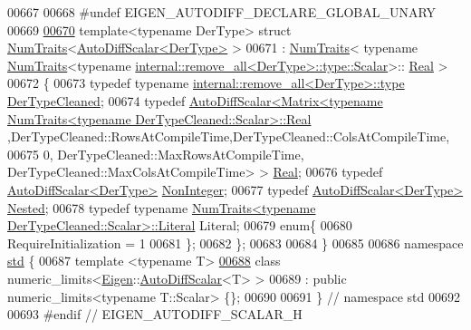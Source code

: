 \begin{DoxyCode}
00667 
00668 #undef EIGEN\_AUTODIFF\_DECLARE\_GLOBAL\_UNARY
00669 
\hyperlink{struct_eigen_1_1_num_traits_3_01_auto_diff_scalar_3_01_der_type_01_4_01_4}{00670} template<typename DerType> \textcolor{keyword}{struct} \hyperlink{group___core___module_struct_eigen_1_1_num_traits}{NumTraits}<\hyperlink{class_eigen_1_1_auto_diff_scalar}{AutoDiffScalar<DerType>} >
00671   : \hyperlink{group___core___module_struct_eigen_1_1_num_traits}{NumTraits}< \textcolor{keyword}{typename} \hyperlink{group___core___module_struct_eigen_1_1_num_traits}{NumTraits}<\textcolor{keyword}{typename} 
      \hyperlink{struct_eigen_1_1internal_1_1remove__all}{internal::remove\_all<DerType>::type::Scalar}>::
      \hyperlink{group___sparse_core___module}{Real} >
00672 \{
00673   \textcolor{keyword}{typedef} \textcolor{keyword}{typename} \hyperlink{group___sparse_core___module}{internal::remove\_all<DerType>::type} 
      \hyperlink{group___sparse_core___module}{DerTypeCleaned};
00674   \textcolor{keyword}{typedef} 
      \hyperlink{class_eigen_1_1_auto_diff_scalar}{AutoDiffScalar<Matrix<typename NumTraits<typename DerTypeCleaned::Scalar>::Real}
      ,DerTypeCleaned::RowsAtCompileTime,DerTypeCleaned::ColsAtCompileTime,
00675                                 0, DerTypeCleaned::MaxRowsAtCompileTime, 
      DerTypeCleaned::MaxColsAtCompileTime> > \hyperlink{group___sparse_core___module}{Real};
00676   \textcolor{keyword}{typedef} \hyperlink{class_eigen_1_1_auto_diff_scalar}{AutoDiffScalar<DerType>} \hyperlink{class_eigen_1_1_auto_diff_scalar}{NonInteger};
00677   \textcolor{keyword}{typedef} \hyperlink{class_eigen_1_1_auto_diff_scalar}{AutoDiffScalar<DerType>} \hyperlink{class_eigen_1_1_auto_diff_scalar}{Nested};
00678   \textcolor{keyword}{typedef} \textcolor{keyword}{typename} \hyperlink{group___core___module_struct_eigen_1_1_num_traits}{NumTraits<typename DerTypeCleaned::Scalar>::Literal}
       Literal;
00679   \textcolor{keyword}{enum}\{
00680     RequireInitialization = 1
00681   \};
00682 \};
00683 
00684 \}
00685 
00686 \textcolor{keyword}{namespace }\hyperlink{namespacestd}{std} \{
00687 \textcolor{keyword}{template} <\textcolor{keyword}{typename} T>
\hyperlink{classstd_1_1numeric__limits_3_01_eigen_1_1_auto_diff_scalar_3_01_t_01_4_01_4}{00688} \textcolor{keyword}{class }numeric\_limits<\hyperlink{namespace_eigen}{Eigen}::\hyperlink{class_eigen_1_1_auto_diff_scalar}{AutoDiffScalar}<T> >
00689   : \textcolor{keyword}{public} numeric\_limits<typename T::Scalar> \{\};
00690 
00691 \}  \textcolor{comment}{// namespace std}
00692 
00693 \textcolor{preprocessor}{#endif // EIGEN\_AUTODIFF\_SCALAR\_H}
\end{DoxyCode}

